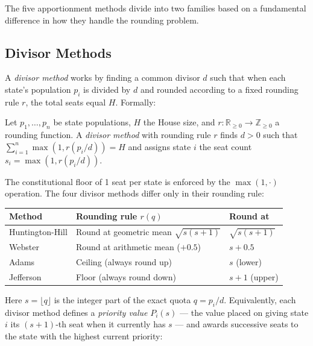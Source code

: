 \label{sec:taxonomy}

The five apportionment methods divide into two families based on a
fundamental difference in how they handle the rounding problem.

\subsection{Divisor Methods}

A \emph{divisor method} works by finding a common divisor $d$ such that
when each state's population $p_i$ is divided by $d$ and rounded according
to a fixed rounding rule $r$, the total seats equal $H$.
Formally:

\begin{definition}
  Let $p_1, \ldots, p_n$ be state populations, $H$ the House size,
  and $r: \mathbb{R}_{\geq 0} \to \mathbb{Z}_{\geq 0}$ a rounding function.
  A \emph{divisor method} with rounding rule $r$ finds $d > 0$ such that
  $\sum_{i=1}^{n} \max(1, r(p_i/d)) = H$ and assigns state $i$ the
  seat count $s_i = \max(1, r(p_i/d))$.
\end{definition}

The constitutional floor of 1 seat per state is enforced by the $\max(1, \cdot)$
operation.
The four divisor methods differ only in their rounding rule:

\begin{center}
\begin{tabular}{lll}
\toprule
Method & Rounding rule $r(q)$ & Round at \\
\midrule
Huntington-Hill & Round at geometric mean $\sqrt{s(s+1)}$ & $\sqrt{s(s+1)}$ \\
Webster         & Round at arithmetic mean ($+0.5$)         & $s + 0.5$ \\
Adams           & Ceiling (always round up)                 & $s$ (lower) \\
Jefferson       & Floor (always round down)                 & $s+1$ (upper) \\
\bottomrule
\end{tabular}
\end{center}

\noindent
Here $s = \lfloor q \rfloor$ is the integer part of the exact quota $q = p_i/d$.
Equivalently, each divisor method defines a \emph{priority value}
$P_i(s)$ --- the value placed on giving state $i$ its $(s+1)$-th seat
when it currently has $s$ --- and awards successive seats to the state
with the highest current priority:

